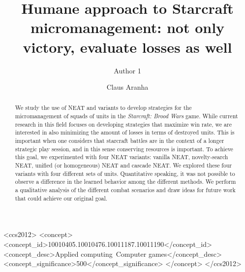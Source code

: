 \documentclass[sigconf, authordraft, anonymous]{acmart}
\begin{document}
\title{Humane approach to Starcraft micromanagement: not only victory, evaluate losses as well}

\author{Author 1}

\author{Claus Aranha}

\begin{abstract}
  We study the use of NEAT and variants to develop strategies for the
  micromanagement of squads of units in the \emph{Starcraft: Brood
    Wars} game. While current research in this field focuses on
  developing strategies that maximize win rate, we are interested in
  also minimizing the amount of losses in terms of destroyed
  units. This is important when one considers that starcraft battles
  are in the context of a longer strategic play session, and in this
  sense conserving resources is important. To achieve this goal, we
  experimented with four NEAT variants: vanilla NEAT, novelty-search
  NEAT, unified (or homogeneous) NEAT and cascade NEAT. We explored
  these four variants with four different sets of units. Quantitative
  speaking, it was not possible to observe a difference in the learned
  behavior among the different methods. We perform a qualitative
  analysis of the different combat scenarios and draw ideas for future
  work that could achieve our original goal.
\end{abstract}

\begin{CCSXML}
<ccs2012>
<concept>
<concept_id>10010405.10010476.10011187.10011190</concept_id>
<concept_desc>Applied computing~Computer games</concept_desc>
<concept_significance>500</concept_significance>
</concept>
</ccs2012>
\end{CCSXML}



\maketitle
\end{document}
